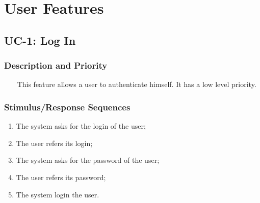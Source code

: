 \documentclass{report}
\begin{document}
\section{User Features}

\subsection{UC-1: Log In}

\subsubsection*{Description and Priority} ~~~
This feature allows a user to authenticate himself.
It has a low level priority.


\subsubsection*{Stimulus/Response Sequences}
\begin{enumerate}
	\item The system asks for the login of the user;
	\item The user refers its login;
	\item The system asks for the password of the user;
	\item The user refers its password;
	\item The system login the user.
\end{enumerate}

\end{document}
